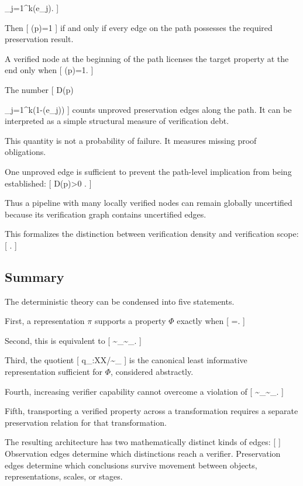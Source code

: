 \documentclass[11pt]{article}
\begin{document}
\prod_{j=1}^{k}\chi(e_j).
]

Then
[
\chi(p)=1
]
if and only if every edge on the path possesses the required preservation result.

A verified node at the beginning of the path licenses the target property at the end only when
[
\chi(p)=1.
]

The number
[
D(p)

\sum_{j=1}^{k}(1-\chi(e_j))
]
counts unproved preservation edges along the path. It can be interpreted as a simple structural measure of verification debt.

This quantity is not a probability of failure. It measures missing proof obligations.

One unproved edge is sufficient to prevent the path-level implication from being established:
[
D(p)>0
\Longrightarrow
{}.
]

Thus a pipeline with many locally verified nodes can remain globally uncertified because its verification graph contains uncertified edges.

This formalizes the distinction between verification density and verification scope:
[
\neq
{}.
]

\subsection{Summary}

The deterministic theory can be condensed into five statements.

First, a representation $\pi$ supports a property $\Phi$ exactly when
[
\Phi=\widehat{\Phi}\circ\pi.
]

Second, this is equivalent to
[
\sim_\pi\subseteq\sim_\Phi.
]

Third, the quotient
[
q_\Phi:\mathcal X\to\mathcal X/{\sim_\Phi}
]
is the canonical least informative representation sufficient for $\Phi$, considered abstractly.

Fourth, increasing verifier capability cannot overcome a violation of
[
\sim_\pi\subseteq\sim_\Phi.
]

Fifth, transporting a verified property across a transformation requires a separate preservation relation for that transformation.

The resulting architecture has two mathematically distinct kinds of edges:
[
]
Observation edges determine which distinctions reach a verifier. Preservation edges determine which conclusions survive movement between objects, representations, scales, or stages.
\end{document}
